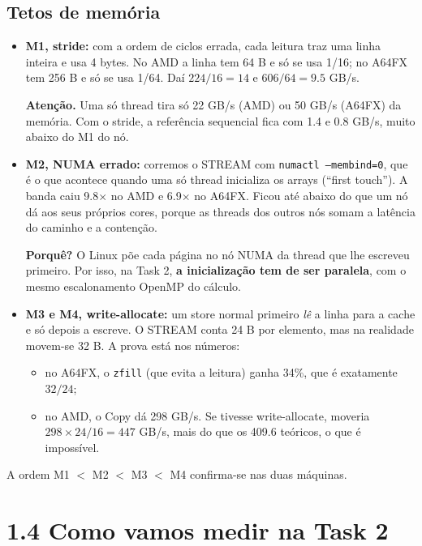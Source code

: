 \documentclass[11pt,a4paper]{article}
\newcommand{\porque}[1]{\par\noindent\colorbox{blue!6}{\parbox{\dimexpr\linewidth-2\fboxsep}{\small\textbf{Porquê?} #1}}\par}
\newcommand{\cuidado}[1]{\par\noindent\colorbox{orange!10}{\parbox{\dimexpr\linewidth-2\fboxsep}{\small\textbf{Atenção.} #1}}\par}
\begin{document}
\subsection{Tetos de memória}
\begin{itemize}
\item \textbf{M1, stride:} com a ordem de ciclos errada, cada leitura traz uma linha inteira e usa 4
bytes. No AMD a linha tem 64 B e só se usa 1/16; no A64FX tem 256 B e só se usa 1/64. Daí
$224/16 = 14$ e $606/64 = 9.5$ GB/s.
\cuidado{Uma só thread tira só 22 GB/s (AMD) ou 50 GB/s (A64FX) da memória. Com o stride, a referência
sequencial fica com 1.4 e 0.8 GB/s, muito abaixo do M1 do nó.}
\item \textbf{M2, NUMA errado:} corremos o STREAM com \texttt{numactl --membind=0}, que é o que acontece
quando uma só thread inicializa os arrays (``first touch''). A banda caiu 9.8$\times$ no AMD e
6.9$\times$ no A64FX. Ficou até abaixo do que um nó dá aos seus próprios cores, porque as threads dos
outros nós somam a latência do caminho e a contenção.
\porque{O Linux põe cada página no nó NUMA da thread que lhe escreveu primeiro. Por isso, na Task 2,
\textbf{a inicialização tem de ser paralela}, com o mesmo escalonamento OpenMP do cálculo.}
\item \textbf{M3 e M4, write-allocate:} um store normal primeiro \emph{lê} a linha para a cache e só
depois a escreve. O STREAM conta 24 B por elemento, mas na realidade movem-se 32 B. A prova está nos
números:
\begin{itemize}
\item no A64FX, o \texttt{zfill} (que evita a leitura) ganha 34\%, que é exatamente $32/24$;
\item no AMD, o Copy dá 298 GB/s. Se tivesse write-allocate, moveria $298\times24/16=447$ GB/s, mais do
que os 409.6 teóricos, o que é impossível.
\end{itemize}
\end{itemize}
A ordem M1 $<$ M2 $<$ M3 $<$ M4 confirma-se nas duas máquinas.

\section{1.4 Como vamos medir na Task 2}
\end{document}

